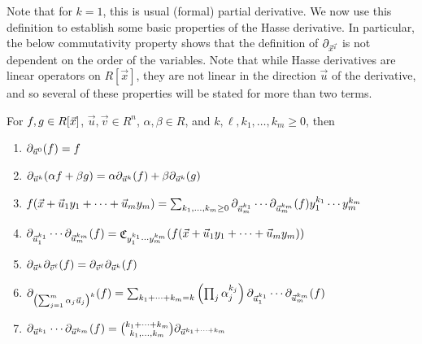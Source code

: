 \documentclass[letterpaper,11pt]{article}
\numberwithin{equation}{section}
\theoremstyle{plain}
\theoremstyle{remark}
\DeclareMathOperator{\coeffo}{\mathfrak{C}}
\newcommand{\coeff}[1]{\coeffo_{#1}}
\begin{document}
Note that for $k=1$, this is usual (formal) partial derivative. We now use this definition to establish some basic properties of the Hasse derivative.  In particular, the below commutativity property shows that the definition of $\partial_{\vec{x}^{\vec{i}}}$ is not dependent on the order of the variables. Note that while Hasse derivatives are linear operators on $R[\vec{x}]$, they are not linear in the direction $\vec{u}$ of the derivative, and so several of these properties will be stated for more than two terms.

\begin{lemma}\label{hassebasic}
	For $f,g\in R[\vec{x}]$, $\vec{u},\vec{v}\in R^n$, $\alpha,\beta\in R$, and $k,\ell,k_1,\ldots,k_m\ge 0$, then
	\begin{enumerate}
		\item $\partial_{\vec{u}^0}(f)=f$\label{hassebasic:ident}
		\item $\partial_{\vec{u}^k}(\alpha f+\beta g)=\alpha\partial_{\vec{u}^k}(f)+\beta\partial_{\vec{u}^k}(g)$\label{hassebasic:linearf}
		\item $f(\vec{x}+\vec{u}_1y_1+\cdots+\vec{u}_my_m)=\sum_{k_1,\ldots,k_m\ge 0}\partial_{\vec{u}_m^{k_1}}\cdots\partial_{\vec{u}_m^{k_m}}(f)y_1^{k_1}\cdots y_m^{k_m}$\label{hassebasic:hassetaylor}
		\item $\hasse_{\vec{u}_1^{k_1}}\cdots\hasse_{\vec{u}_m^{k_m}}(f)=\coeff{y_1^{k_1}\cdots y_m^{k_m}}(f(\vec{x}+\vec{u}_1y_1+\cdots+\vec{u}_my_m))$\label{hassebasic:hassecoeff}
		\item $\partial_{\vec{u}^k}\partial_{\vec{v}^\ell}(f)=\partial_{\vec{v}^\ell}\partial_{\vec{u}^k}(f)$\label{hassebasic:commut}
		\item $\partial_{\left(\sum_{j=1}^m\alpha_j\vec{u}_j\right)^k}(f)=\sum_{k_1+\cdots+k_m=k} \left(\prod_j\alpha_j^{k_j}\right) \partial_{\vec{u}_1^{k_1}}\cdots\partial_{\vec{u}_m^{k_m}}(f)$\label{hassebasic:directionlinearity}
		\item $\partial_{\vec{u}^{k_1}}\cdots\partial_{\vec{u}^{k_m}}(f)=\binom{k_1+\cdots+k_m}{k_1,\ldots,k_m}\partial_{\vec{u}^{k_1+\cdots+k_m}}$\label{hassebasic:hassehasse}
	\end{enumerate}
\end{lemma}
\end{document}

